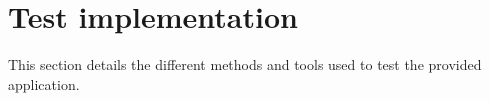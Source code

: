 \section{Test implementation}
This section details the different methods and tools used to test the provided application.



